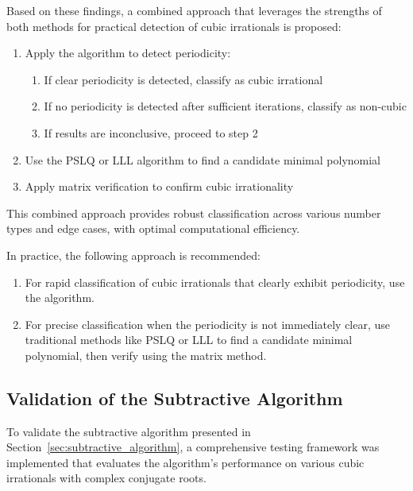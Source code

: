 Based on these findings, a combined approach that leverages the strengths of both methods for practical detection of cubic irrationals is proposed:

\begin{algorithm_def}
\begin{enumerate}
\item Apply the \HAPD{} algorithm to detect periodicity:
   \begin{enumerate}
   \item If clear periodicity is detected, classify as cubic irrational
   \item If no periodicity is detected after sufficient iterations, classify as non-cubic
   \item If results are inconclusive, proceed to step 2
   \end{enumerate}
\item Use the PSLQ or LLL algorithm to find a candidate minimal polynomial
\item Apply matrix verification to confirm cubic irrationality
\end{enumerate}
\end{algorithm_def}

This combined approach provides robust classification across various number types and edge cases, with optimal computational efficiency.

In practice, the following approach is recommended:
\begin{enumerate}
\item For rapid classification of cubic irrationals that clearly exhibit periodicity, use the \HAPD{} algorithm.
\item For precise classification when the periodicity is not immediately clear, use traditional methods like PSLQ or LLL to find a candidate minimal polynomial, then verify using the matrix method.
\end{enumerate}

\subsection{Validation of the Subtractive Algorithm}

To validate the subtractive algorithm presented in Section~\ref{sec:subtractive_algorithm}, a comprehensive testing framework was implemented that evaluates the algorithm's performance on various cubic irrationals with complex conjugate roots.

